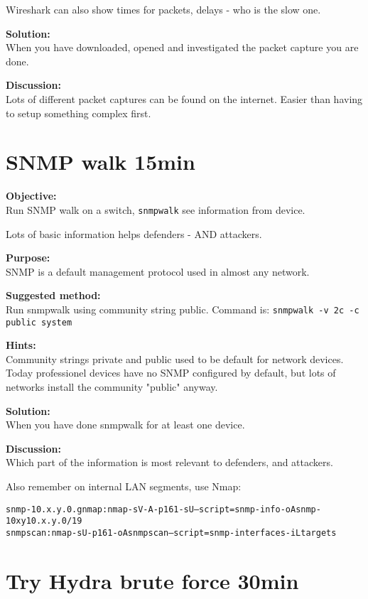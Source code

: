 \documentclass[a4paper,11pt,notitlepage]{report}
\begin{document}
Wireshark can also show times for packets, delays - who is the slow one.

{\bf Solution:}\\
When you have downloaded, opened and investigated the packet capture you are done.

{\bf Discussion:}\\
Lots of different packet captures can be found on the internet. Easier than having to setup something complex first.


\chapter{SNMP walk 15min}
\label{ex:snmpwalk}

{\bf Objective:}\\
Run SNMP walk on a switch, \verb+snmpwalk+ see information from device.

Lots of basic information helps defenders - AND attackers.

{\bf Purpose:}\\
SNMP is a default management protocol used in almost any network.

{\bf Suggested method:}\\
Run snmpwalk using community string public.
Command is: \verb+snmpwalk -v 2c -c public system+


{\bf Hints:}\\
Community strings private and public used to be default for network devices. Today professionel devices have no SNMP configured by default, but lots of networks install the community "public" anyway.

{\bf Solution:}\\
When you have done snmpwalk for at least one device.

{\bf Discussion:}\\
Which part of the information is most relevant to defenders, and attackers.

Also remember on internal LAN segments, use Nmap:
\begin{alltt}
snmp-10.x.y.0.gnmap: nmap -sV -A -p 161 -sU --script=snmp-info -oA snmp-10xy 10.x.y.0/19
snmpscan: nmap -sU -p 161 -oA snmpscan --script=snmp-interfaces -iL targets
\end{alltt}


\chapter{Try Hydra brute force 30min}
\label{ex:hydra-brute}
\end{document}

